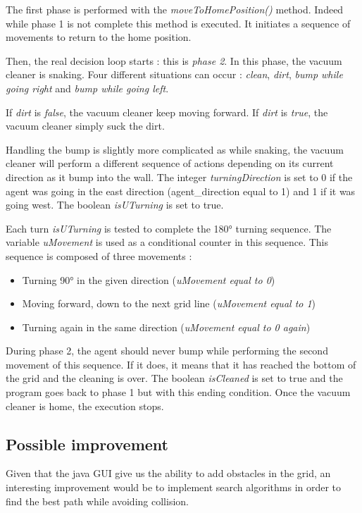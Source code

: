 The first phase is performed with the \textit{moveToHomePosition()} method.
Indeed while phase 1 is not complete this method is executed.
It initiates a sequence of movements to return to the home position.

Then, the real decision loop starts : this is \textit{phase 2}. In this phase,
the vacuum cleaner is snaking. Four different situations can occur : \textit{clean},
\textit{dirt}, \textit{bump while going right} and \textit{bump while going left}.

If \textit{dirt} is \textit{false}, the vacuum cleaner keep moving forward.
If \textit{dirt} is \textit{true}, the vacuum cleaner simply suck the dirt.

Handling the bump is slightly more complicated as while snaking, the vacuum
cleaner will perform a different sequence of actions depending on its current
direction as it bump into the wall.
The integer \textit{turningDirection} is set to 0 if the agent was going
in the east direction \newline(agent\_direction equal to 1) and 1 if it was going west.
The boolean \textit{isUTurning} is set to true.

Each turn \textit{isUTurning} is tested to complete the 180° turning sequence.
The variable \textit{uMovement} is used as a conditional counter in this sequence.
\newpage This sequence is composed of three movements :
\begin{itemize}
  \item Turning 90° in the given direction (\textit{uMovement equal to 0})
  \item Moving forward, down to the next grid line (\textit{uMovement equal to 1})
  \item Turning again in the same direction (\textit{uMovement equal to 0 again})
\end{itemize}

During phase 2, the agent should never bump while performing the second movement
of this sequence. If it does, it means that it has reached the bottom of the grid
and the cleaning is over. The boolean \textit{isCleaned} is set to true and the
program goes back to phase 1 but with this ending condition. Once the vacuum
cleaner is home, the execution stops.

\subsection{Possible improvement}

Given that the java GUI give us the ability to add obstacles in the grid,
an interesting improvement would be to implement search algorithms in order to
find the best path while avoiding collision.

